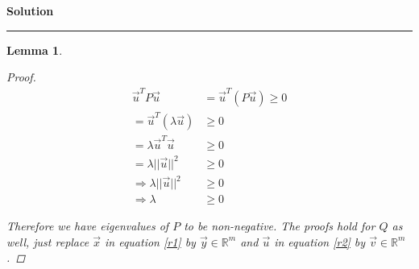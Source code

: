 \documentclass[a4paper,12pt]{article}
\newenvironment{solution}[2][]{%
    \begin{mdframed}[linecolor=blue!70!black, linewidth=2pt, roundcorner=10pt, backgroundcolor=yellow!10!white, skipabove=12pt, skipbelow=12pt]%
        \textbf{\large #2}
        \par\noindent\rule{\textwidth}{0.4pt}
}{
    \end{mdframed}
}
\newtheorem{lemma}{Lemma}
\begin{document}
\begin{solution}{Solution}
\begin{lemma}
\begin{proof}
            \begin{align}
               \vec{u}^{T} P \vec{u} &= \vec{u}^{T}(P \vec{u}) \geqslant 0 \nonumber  \\
                                     = \vec{u}^{T}(\lambda \vec{u}) &\geqslant 0 \nonumber \\
                                     = \lambda \vec{u}^{T} \vec{u} &\geqslant 0\nonumber \\
                                     = \lambda \lvert\lvert \vec{u} \rvert\rvert^{2} &\geqslant 0 \nonumber \\
                \Rightarrow \lambda \lvert\lvert \vec{u} \rvert\rvert^{2} &\geqslant 0 \nonumber \\
                \Rightarrow \label{r2}\lambda &\geqslant 0
            \end{align}

            Therefore we have eigenvalues of $P$ to be non-negative. The proofs hold for $Q$ as well, just replace $\vec{x}$ in
            equation \@\ref{r1} by $\vec{y} \in \mathbb{R}^{m}$ and $\vec{u}$ in equation \@\ref{r2} by
            $\vec{v} \in \mathbb{R}^{m}$.
          \end{proof}
        \end{lemma}


\end{solution}
\end{document}
